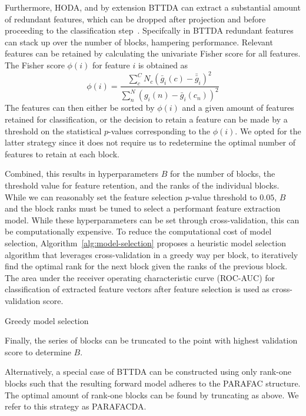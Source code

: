 Furthermore, HODA, and by extension BTTDA can extract a substantial amount
of redundant features, which can be dropped after projection and before proceeding to the classification
step~\cite{Phan2010}.
Specifcally in BTTDA redundant features can stack up over the number of
blocks, hampering performance.
Relevant features can be retained by calculating the
univariate Fisher score for all features.
The Fisher score $\phi(i)$ for feature $i$ is obtained as
\begin{equation}
	\phi(i) = \frac
	{\sum_c^C N_c \left(\bar{g}_i(c)-\bar{\bar{g}}_i\right)^2}
	{\sum_n^N \left(g_i(n)-\bar{g}_i(c_n)\right)^2}
\end{equation}
The features can then either be sorted by $\phi(i)$ and a given amount of
features retained for classification, or the decision to retain a feature can
be made by a threshold on the statistical $p$-values corresponding to the
$\phi(i)$.
We opted for the latter strategy since it does not require us to redetermine the
optimal number of features to retain at each block.

Combined, this results in hyperparameters $B$ for the number of blocks, the
threshold value for feature retention, and the ranks of the individual blocks.
While we can reasonably set the feature selection $p$-value threshold to $0.05$,
$B$ and the block ranks must be tuned to select a performant feature extraction
model.
While these hyperparameters can be set through cross-validation, this can be
computationally expensive.
To reduce the computational cost of model selection,
Algorithm~\ref{alg:model-selection} proposes a heuristic model selection
algorithm that leverages cross-validation in a greedy way per block, to
iteratively find the optimal rank for the next block given the ranks of the
previous block.
The area under the receiver operating characteristic curve (ROC-AUC) for
classification of extracted feature vectors after feature selection is used as
cross-validation score.
\begin{algorithm}
  \caption[The greedy model selection procedure.]{Greedy model selection}
	\label{alg:model-selection}
	
\end{algorithm}
Finally, the series of blocks can be truncated to the point with
highest validation score to determine $B$.

Alternatively, a special case of BTTDA can be constructed using only rank-one
blocks such that the resulting forward model adheres to the PARAFAC structure.
The optimal amount of rank-one blocks can be found by truncating as above.
We refer to this strategy as PARAFACDA.


